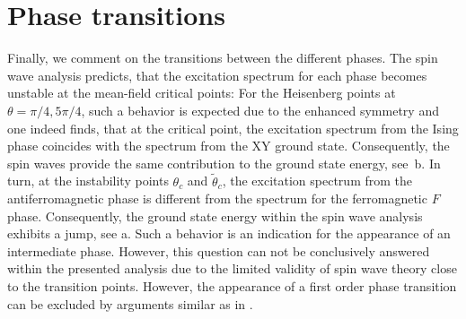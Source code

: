 \section{Phase transitions}
Finally, we comment on the transitions between the different phases. The spin wave analysis predicts,
that the excitation spectrum for each phase becomes unstable at the mean-field critical points: For the Heisenberg
points at $\theta = \pi/4, 5\pi/4$, such a behavior is expected due to the enhanced symmetry and one indeed finds,
that at the critical point, the excitation spectrum from the Ising phase coincides with the spectrum from the XY ground state.
Consequently, the spin waves provide the same contribution to the ground state energy, see~b. In turn, at the instability points
$\theta_{c}$ and $\tilde{\theta}_{c}$, the excitation spectrum from the antiferromagnetic phase is different from the spectrum for the ferromagnetic $F$ phase.
Consequently, the ground state energy within the spin wave analysis exhibits a jump, see a. Such a behavior is an indication
for the appearance of an intermediate phase. However, this question can not be conclusively answered within the presented analysis due to the limited validity of spin wave theory close to the transition points. However, the appearance of a first order phase transition can be excluded by arguments similar as in .
